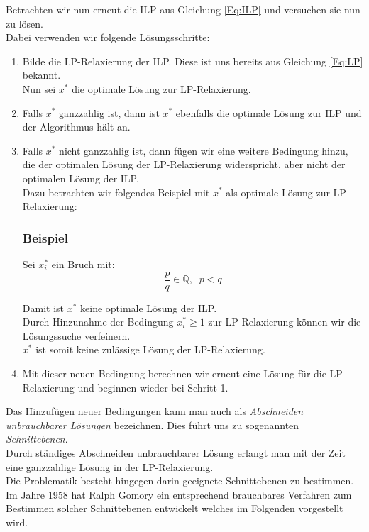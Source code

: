 \documentclass[tog]{acmsiggraph}
\begin{document}
Betrachten wir nun erneut die ILP aus Gleichung \ref{Eq:ILP} und versuchen sie nun zu lösen.\\
Dabei verwenden wir folgende Lösungsschritte:
\begin{enumerate}
\item Bilde die LP-Relaxierung der ILP. Diese ist uns bereits aus Gleichung \ref{Eq:LP} bekannt.\\ Nun sei $x^{*}$ die optimale Lösung zur LP-Relaxierung.
\item Falls $x^{*}$ ganzzahlig ist, dann ist $x^{*}$ ebenfalls die optimale Lösung zur ILP und der Algorithmus hält an.
\item Falls $x^{*}$ nicht ganzzahlig ist, dann fügen wir eine weitere Bedingung hinzu, die der optimalen Lösung der LP-Relaxierung widerspricht, aber nicht der optimalen Lösung der ILP.\\
Dazu betrachten wir folgendes Beispiel mit $x^{*}$ als optimale Lösung zur LP-Relaxierung:\\

\subsubsection*{Beispiel}
Sei $x^{*}_{i}$ ein Bruch mit:
\large
\begin{equation}
\frac{p}{q} \in \mathbb{Q},\;\; p < q \nonumber
\end{equation}
\normalsize

Damit ist $x^{*}$ keine optimale Lösung der ILP.\\
Durch Hinzunahme der Bedingung $x^{*}_{i} \ge 1$ zur LP-Relaxierung können wir die Lösungssuche verfeinern.\\
$x^{*}$ ist somit keine zulässige Lösung der LP-Relaxierung.

\item Mit dieser neuen Bedingung berechnen wir erneut eine Lösung für die LP-Relaxierung und beginnen wieder bei Schritt 1.

\end{enumerate}

Das Hinzufügen neuer Bedingungen kann man auch als \textit{Abschneiden unbrauchbarer Lösungen} bezeichnen. Dies führt uns zu sogenannten \textit{Schnittebenen}.\\
Durch ständiges Abschneiden unbrauchbarer Lösung erlangt man mit der Zeit eine ganzzahlige Lösung in der LP-Relaxierung.\\
Die Problematik besteht hingegen darin geeignete Schnittebenen zu bestimmen.\\
Im Jahre 1958 hat Ralph Gomory ein entsprechend brauchbares Verfahren zum Bestimmen solcher Schnittebenen entwickelt welches im Folgenden vorgestellt wird.
\end{document}
